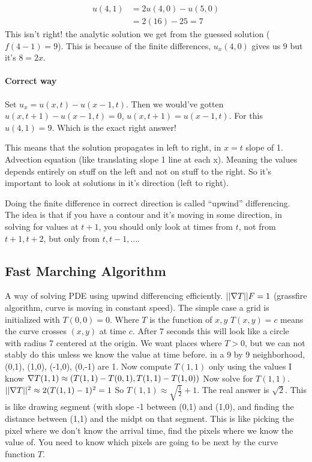 \begin{align*}
u(4,1) &= 2u(4,0) - u(5, 0) \\  
&=2(16) - 25 = 7
\end{align*}
This isn't right! the analytic solution we get from the guessed
solution ($f(4-1) = 9$).
This is because of the finite differences, $u_x(4,0)$ gives us $9$ but
it's $8=2x$.

\paragraph{Correct way}
\label{sec:correct-way}
Set $u_x = u(x,t) - u(x-1, t)$.
Then we would've gotten $u(x,t+1) - u(x-1, t) = 0$, $u(x,t+1) =
u(x-1,t)$. For this $u(4,1) = 9$. Which is the exact right answer!

This means that the solution propagates in left to right, in $x=t$
slope of 1. Advection equation (like translating slope 1 line at each
x). Meaning the values depends entirely on stuff on the left and not
on stuff to the right. So it's important to look at solutions in it's
direction (left to right).

Doing the finite difference in correct direction is called ``upwind''
differencing. The idea is that if you have a contour and it's moving
in some direction, in solving for values at $t+1$, you should only
look at times from $t$, not from $t+1, t+2$, but only from $t, t-1,
\dots$.

\subsection{Fast Marching Algorithm}
\label{sec:fast-march-alg}
A way of solving PDE using upwind differencing efficiently. 
$||\nabla T ||F = 1$ (grassfire algorithm, curve is moving in
constant speed). The simple case a grid is initialized with $T(0,0) =
0$. Where $T$ is the function of $x, y$ $T(x,y) = c$ means the curve
crosses $(x,y)$ at time $c$.  After $7$ seconds this will look like a
circle with radius 7 centered at the origin. 
We want places where $T > 0$, but we can not stably do this unless we
know the value at time before. in a 9 by 9 neighborhood, (0,1), (1,0),
(-1,0), (0,-1) are 1.  Now compute $T(1,1)$ only using the values I
know
$\nabla T(1,1) \approx (T(1,1) - T(0,1), T(1,1) - T(1,0))$
Now solve for $T(1,1)$. 
$||\nabla T||^2 \approx 2(T(1,1) - 1)^2 = 1$
So $T(1,1) \approx \sqrt{\frac{1}{2}} + 1$. The real answer is
$\sqrt{2}$. This is like drawing segment
(with slope -1 between (0,1) and (1,0), and finding the distance
between (1,1) and the midpt on that segment.
This is like picking the pixel where we don't know the arrival time,
find the pixels where we know the value of.  You need to know which
pixels are going to be next by the curve function $T$. 

